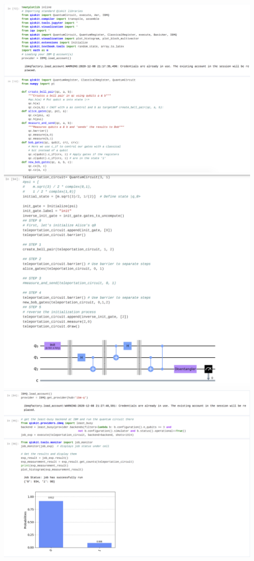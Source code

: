 \documentclass[a4paper,12pt]{article}
\begin{document}
\begin{enumerate}
          \includegraphics[scale=0.40]{5.2c/image1.png}\\
          \includegraphics[scale=0.40]{5.2c/image2.png}\\
          \includegraphics[scale=0.40]{5.2c/image3.png}\\

\end{enumerate}
\end{document}
